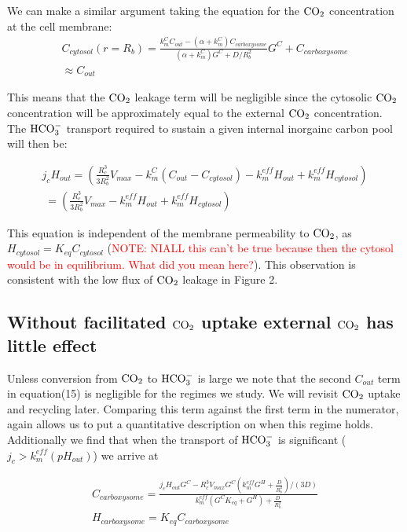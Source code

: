 \documentclass[]{article}
\begin{document}
We can make a similar argument taking the equation for the ${\rm CO_2}$ concentration at the cell membrane:
\begin{multline}
C_{cytosol}(r = R_b) = \frac{k_m^C C_{out} - (\alpha + k_m^C)C_{carboxysome}}{(\alpha+k_m^C)G^C + D/R_b^2}G^C + C_{carboxysome}\\
\approx C_{out}
\end{multline}

This means that the ${\rm CO_2}$ leakage term will be negligible since the cytosolic ${\rm CO_2}$ concentration will be approximately equal to the external ${\rm CO_2}$ concentration. The ${\rm HCO_3^-}$ transport required to sustain a given internal inorgainc carbon pool will then be:

\begin{multline}
j_c H_{out} =  \left(\frac{R_c^3}{3 R_b^2}  V_{max}  -k_m^C \left( C_{out} - C_{cytosol} \right) - k_m^{eff} H_{out} + k_m^{eff} H_{cytosol} \right) \\ 
\; = \left(\frac{R_c^3}{3 R_b^2}  V_{max}  - k_m^{eff} H_{out} + k_m^{eff} H_{cytosol} \right)
\end{multline}

This equation is independent of the membrane permeability to ${\rm CO_2}$, as $H_{cytosol} = K_{eq}C_{cytosol}$ (\textcolor{red}{NOTE: NIALL this can't be true because then the cytosol would be in equilibrium. What did you mean here?}). This observation is consistent with the low flux of ${\rm CO_2}$ leakage in Figure 2.

\subsection{Without facilitated ${\rm CO_2}$ uptake external ${\rm CO_2}$ has little effect}

Unless conversion from ${\rm CO_2}$ to ${\rm HCO_3^-}$ is large we note that the second $C_{out}$ term in equation(15) is negligible for the regimes we study. We will revisit ${\rm CO_2}$ uptake and recycling later. Comparing this term against the first term in the numerator, again allows us to put a quantitative description on when this regime holds. Additionally we find that when the transport of ${\rm HCO_3^-}$ is significant ($j_c > k_m^{eff}(pH_{out})$) we arrive at

\begin{eqnarray}
	C_{carboxysome} = \frac{j_c H_{out}G^C - R_c^3 V_{max}G^C(k_m^{eff} G^H + \frac{D}{R_b^2})/(3D)}
	{k_m^{eff}(G^C K_{eq} +  G^H) + \frac{D}{R_b^2} }\\
	H_{carboxysome} = K_{eq} C_{carboxysome}
\end{eqnarray}
\end{document}
